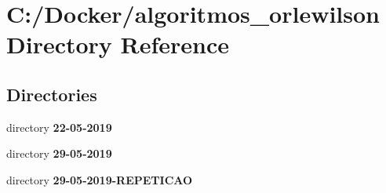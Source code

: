 \section{C\+:/\+Docker/algoritmos\+\_\+orlewilson Directory Reference}
\label{dir_bb7abb6dc5b780e086d391168edb370e}
\subsection*{Directories}
\begin{DoxyCompactItemize}
\item 
directory \textbf{ 22-\/05-\/2019}
\item 
directory \textbf{ 29-\/05-\/2019}
\item 
directory \textbf{ 29-\/05-\/2019-\/\+R\+E\+P\+E\+T\+I\+C\+AO}
\end{DoxyCompactItemize}
